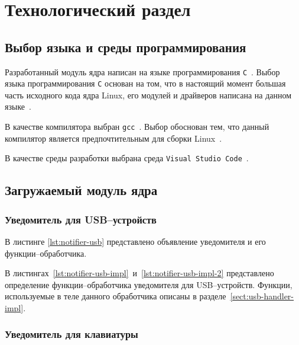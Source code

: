 \chapter{Технологический раздел}

\section{Выбор языка и среды программирования}

Разработанный модуль ядра написан на языке программирования \texttt{C}~\cite{c-language}. Выбор языка программирования \texttt{С} основан на том, что в настоящий момент большая часть исходного кода ядра Linux, его модулей и драйверов написана на данном языке~\cite{rust-in-linux}.

В качестве компилятора выбран \texttt{gcc}~\cite{gcc}. Выбор обоснован тем, что данный компилятор является предпочтительным для сборки Linux~\cite{build-linux}.

В качестве среды разработки выбрана среда \texttt{Visual Studio Code}~\cite{vscode}.

\section{Загружаемый модуль ядра}

\subsection{Уведомитель для USB--устройств}

В листинге \ref{lst:notifier-usb} представлено объявление уведомителя и его функции--обработчика.


В листингах~\ref{lst:notifier-usb-impl}~и~\ref{lst:notifier-usb-impl-2} представлено определение функции--обработчика уведомителя для USB--устройств. Функции, используемые в теле данного обработчика описаны в разделе~\ref{sect:usb-handler-impl}.



\subsection{Уведомитель для клавиатуры}

